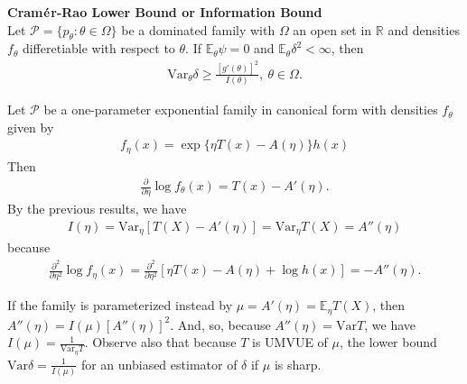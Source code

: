 \begin{theorem}
    \textbf{Cram$\boldsymbol{\mathrm{\Acute{e}}}$r-Rao Lower Bound or Information Bound}\\
    Let $\mathcal{P}=\{p_\theta:\theta\in\Omega\}$ be a dominated family with $\Omega$ an open set in $\mathbb{R}$ and 
    densities $f_\theta$ differetiable with respect to $\theta$.
    If $\mathbb{E}_\theta\psi=0$ and $\mathbb{E}_\theta\delta^2<\infty$, then
    \begin{gather}
        \mathrm{Var}_\theta\delta\geq\frac{[g'(\theta)]^2}{I(\theta)},~\theta\in\Omega.
    \end{gather}
\end{theorem}

\begin{example}
    Let $\mathcal{P}$ be a one-parameter exponential family in canonical form with densities $f_\theta$ given by
    \begin{gather}
        f_\eta(x)=\exp\{\eta{T(x)}-A(\eta)\}h(x)
    \end{gather}
    Then
    \begin{gather}
        \frac{\partial}{\partial\eta}\log{f_\theta(x)}=T(x)-A'(\eta).
    \end{gather}
    By the previous results, we have
    \begin{gather}
        I(\eta)=\mathrm{Var}_\eta[T(X)-A'(\eta)]=\mathrm{Var}_\eta{T(X)}=A''(\eta)
    \end{gather}
    because
    \begin{gather}
        \frac{\partial^2}{\partial{\eta^2}}\log{f_\eta(x)}
        = \frac{\partial^2}{\partial{\eta^2}}[\eta T(x)-A(\eta)+\log{h(x)}]=-A''(\eta).
    \end{gather}

    If the family is parameterized instead by $\mu=A'(\eta)=\mathbb{E}_\eta T(X)$,
    then $A''(\eta)=I(\mu)[A''(\eta)]^2$. 
    And, so, because $A''(\eta)=\mathrm{Var}T$, we have $I(\mu)=\frac{1}{\mathrm{Var}_\eta{T}}$.
    Observe also that because $T$ is UMVUE of $\mu$, 
    the lower bound $\mathrm{Var}\delta=\frac{1}{I(\mu)}$ for an unbiased estimator of $\delta$ if $\mu$ is sharp.
\end{example}

